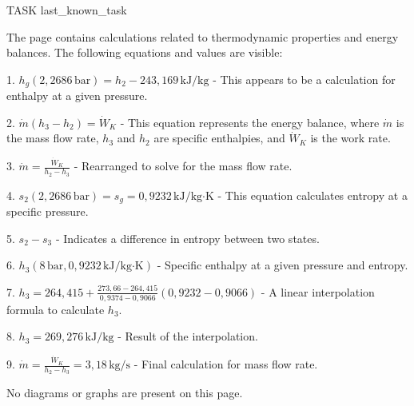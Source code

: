 TASK {last_known_task}

The page contains calculations related to thermodynamic properties and energy balances. The following equations and values are visible:

1. \( h_g(2,2686 \, \text{bar}) = h_2 - 243,169 \, \text{kJ/kg} \)
   - This appears to be a calculation for enthalpy at a given pressure.

2. \( \dot{m}(h_3 - h_2) = \dot{W}_K \)
   - This equation represents the energy balance, where \( \dot{m} \) is the mass flow rate, \( h_3 \) and \( h_2 \) are specific enthalpies, and \( \dot{W}_K \) is the work rate.

3. \( \dot{m} = \frac{\dot{W}_K}{h_2 - h_3} \)
   - Rearranged to solve for the mass flow rate.

4. \( s_2(2,2686 \, \text{bar}) = s_g = 0,9232 \, \text{kJ/kg·K} \)
   - This equation calculates entropy at a specific pressure.

5. \( s_2 - s_3 \)
   - Indicates a difference in entropy between two states.

6. \( h_3(8 \, \text{bar}, 0,9232 \, \text{kJ/kg·K}) \)
   - Specific enthalpy at a given pressure and entropy.

7. \( h_3 = 264,415 + \frac{273,66 - 264,415}{0,9374 - 0,9066}(0,9232 - 0,9066) \)
   - A linear interpolation formula to calculate \( h_3 \).

8. \( h_3 = 269,276 \, \text{kJ/kg} \)
   - Result of the interpolation.

9. \( \dot{m} = \frac{\dot{W}_K}{h_2 - h_3} = 3,18 \, \text{kg/s} \)
   - Final calculation for mass flow rate.

No diagrams or graphs are present on this page.